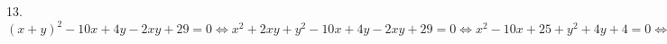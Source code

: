 13. $(x+y)^2-10x+4y-2xy+29=0\Leftrightarrow x^2+2xy+y^2-10x+4y-2xy+29=0\Leftrightarrow x^2-10x+25+y^2+4y+4=0\Leftrightarrow
(x-5)^2+(y+2)^2=0\Leftrightarrow x=5,\ y=-2.$\\
